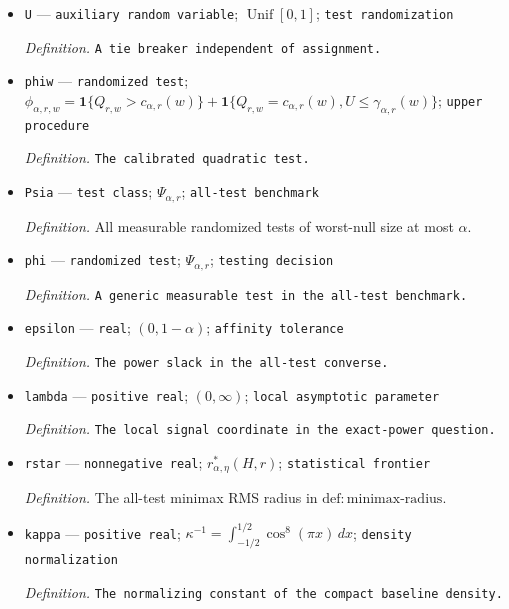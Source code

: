 \documentclass{article}
\begin{document}
\begin{itemize}
  \par\smallskip\noindent\emph{Definition.} \texttt{The largest valid boundary randomization.}
  \item \texttt{U} --- \texttt{auxiliary random variable}; \(\operatorname{Unif}[0,1]\); \texttt{test randomization}
  \par\smallskip\noindent\emph{Definition.} \texttt{A tie breaker independent of assignment.}
  \item \texttt{phiw} --- \texttt{randomized test}; \(\phi_{\alpha,r,w}=\mathbf1\{Q_{r,w}>c_{\alpha,r}(w)\}+\mathbf1\{Q_{r,w}=c_{\alpha,r}(w),U\le\gamma_{\alpha,r}(w)\}\); \texttt{upper procedure}
  \par\smallskip\noindent\emph{Definition.} \texttt{The calibrated quadratic test.}
  \item \texttt{Psia} --- \texttt{test class}; \(\Psi_{\alpha,r}\); \texttt{all-\allowbreak{}test benchmark}
  \par\smallskip\noindent\emph{Definition.} All measurable randomized tests of worst-null size at most \(\alpha\).
  \item \texttt{phi} --- \texttt{randomized test}; \(\Psi_{\alpha,r}\); \texttt{testing decision}
  \par\smallskip\noindent\emph{Definition.} \texttt{A generic measurable test in the all-\allowbreak{}test benchmark.}
  \item \texttt{epsilon} --- \texttt{real}; \((0,1-\alpha)\); \texttt{affinity tolerance}
  \par\smallskip\noindent\emph{Definition.} \texttt{The power slack in the all-\allowbreak{}test converse.}
  \item \texttt{lambda} --- \texttt{positive real}; \((0,\infty)\); \texttt{local asymptotic parameter}
  \par\smallskip\noindent\emph{Definition.} \texttt{The local signal coordinate in the exact-\allowbreak{}power question.}
  \item \texttt{rstar} --- \texttt{nonnegative real}; \(r^*_{\alpha,\eta}(H,r)\); \texttt{statistical frontier}
  \par\smallskip\noindent\emph{Definition.} The all-test minimax RMS radius in \(\mathrm{def:minimax\text{-}radius}\).
  \item \texttt{kappa} --- \texttt{positive real}; \(\kappa^{-1}=\int_{-1/2}^{1/2}\cos^8(\pi x)\,dx\); \texttt{density normalization}
  \par\smallskip\noindent\emph{Definition.} \texttt{The normalizing constant of the compact baseline density.}

\end{itemize}
\end{document}
